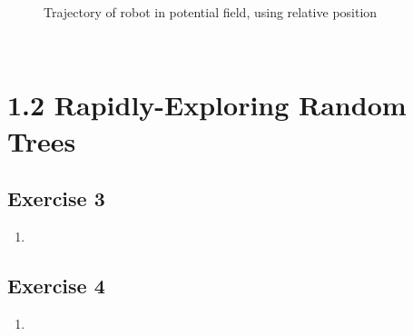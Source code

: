 \documentclass[12pt,a4paper]{article}
\begin{document}
\begin{enumerate}[label=(\alph*)]
\begin{figure}[!h]
		\caption{Trajectory of robot in potential field, using relative position}
		\label{fig:trajectory}
	\end{figure}

\end{enumerate}$$
\section*{1.2 Rapidly-Exploring Random Trees}
\subsection*{Exercise 3}
\begin{enumerate}[label=(\alph*)]
	\item 

\end{enumerate}
\subsection*{Exercise 4}
\begin{enumerate}[label=(\alph*)]
	\item 

\end{enumerate}
\end{document}
